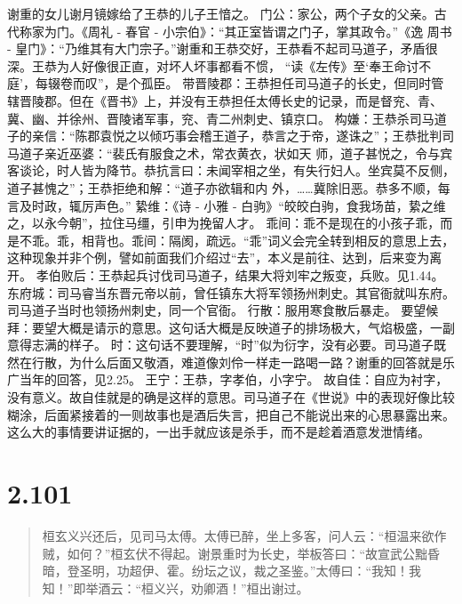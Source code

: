 \documentclass[]{book}
\begin{document}
谢重的女儿谢月镜嫁给了王恭的儿子王愔之。
门公：家公，两个子女的父亲。古代称家为门。《周礼 - 春官 -
小宗伯》：``其正室皆谓之门子，掌其政令。''《逸 周书 -
皇门》：``乃维其有大门宗子。''谢重和王恭交好，王恭看不起司马道子，矛盾很深。王恭为人好像很正直，对坏人坏事都看不惯，
``读《左传》至`奉王命讨不庭'，每辍卷而叹''，是个孤臣。
带晋陵郡：王恭担任司马道子的长史，但同时管辖晋陵郡。但在《晋书》上，并没有王恭担任太傅长史的记录，而是督兖、青、冀、幽、并徐州、晋陵诸军事，兖、青二州刺史、镇京口。
构嫌：王恭杀司马道子的亲信：``陈郡袁悦之以倾巧事会稽王道子，恭言之于帝，遂诛之''；王恭批判司马道子亲近巫婆：``裴氏有服食之术，常衣黄衣，状如天
师，道子甚悦之，令与宾客谈论，时人皆为降节。恭抗言曰：未闻宰相之坐，有失行妇人。坐宾莫不反侧，道子甚愧之''；王恭拒绝和解：``道子亦欲辑和内
外，\ldots{}\ldots{}冀除旧恶。恭多不顺，每言及时政，辄厉声色。''
絷维：《诗 - 小雅 -
白驹》``皎皎白驹，食我场苗，絷之维之，以永今朝''，拉住马缰，引申为挽留人才。
乖间：乖不是现在的小孩子乖，而是不乖。乖，相背也。乖间：隔阂，疏远。``乖''词义会完全转到相反的意思上去，这种现象并非个例，譬如前面我们介绍过``去''，本义是前往、达到，后来变为离开。
孝伯败后：王恭起兵讨伐司马道子，结果大将刘牢之叛变，兵败。见1.44。
东府城：司马睿当东晋元帝以前，曾任镇东大将军领扬州刺史。其官衙就叫东府。司马道子当时也领扬州刺史，同一个官衙。
行散：服用寒食散后暴走。
要望候拜：要望大概是请示的意思。这句话大概是反映道子的排场极大，气焰极盛，一副意得志满的样子。
时：这句话不要理解，``时''似为衍字，没有必要。司马道子既然在行散，为什么后面又敬酒，难道像刘伶一样走一路喝一路？谢重的回答就是乐广当年的回答，见2.25。
王宁：王恭，字孝伯，小字宁。
故自佳：自应为衬字，没有意义。故自佳就是的确是这样的意思。司马道子在《世说》中的表现好像比较糊涂，后面紧接着的一则故事也是酒后失言，把自己不能说出来的心思暴露出来。这么大的事情要讲证据的，一出手就应该是杀手，而不是趁着酒意发泄情绪。

\section{2.101}\label{section-147}

\begin{quote}
桓玄义兴还后，见司马太傅。太傅已醉，坐上多客，问人云：``桓温来欲作贼，如何？''桓玄伏不得起。谢景重时为长史，举板答曰：``故宣武公黜昏暗，登圣明，功超伊、霍。纷坛之议，裁之圣鉴。''太傅曰：``我知！我知！''即举酒云：``桓义兴，劝卿酒！''桓出谢过。
\end{quote}
\end{document}
